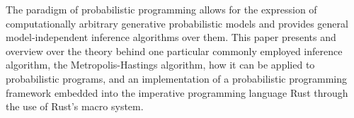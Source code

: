 The paradigm of probabilistic programming allows for the expression of computationally arbitrary generative probabilistic models and provides general model-independent inference algorithms over them. This paper presents and overview over the theory behind one particular commonly employed inference algorithm, the Metropolis-Hastings algorithm, how it can be applied to probabilistic programs, and an implementation of a probabilistic programming framework embedded into the imperative programming language Rust through the use of Rust's macro system.